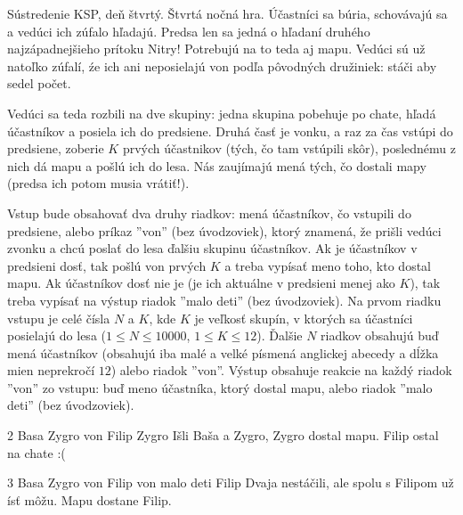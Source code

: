 



Sústredenie KSP, deň štvrtý. Štvrtá nočná hra. Účastníci sa búria, schovávajú 
sa a vedúci ich zúfalo hľadajú. Predsa len sa jedná o hľadaní druhého 
najzápadnejšieho prítoku Nitry! Potrebujú na to teda aj mapu. Vedúci sú už 
natoľko zúfalí, źe ich ani neposielajú von podľa pôvodných družiniek: stáči 
aby sedel počet.

Vedúci sa teda rozbili na dve skupiny: jedna skupina pobehuje po chate, hľadá 
účastníkov a posiela ich do predsiene. Druhá časť je vonku, a raz za čas 
vstúpi do predsiene, zoberie $K$ prvých účastnikov (tých, čo tam vstúpili 
skôr), poslednému z nich dá mapu a pošlú ich do lesa. Nás zaujímajú mená tých, 
čo dostali mapy (predsa ich potom musia vrátiť!).

Vstup bude obsahovať dva druhy riadkov: mená účastníkov, čo vstupili do predsiene, alebo príkaz ''von'' (bez úvodzoviek), ktorý znamená, že prišli vedúci zvonku a chcú poslať do lesa ďalšiu skupinu účastníkov. Ak je účastníkov v predsieni dosť, tak pošlú von prvých $K$ a treba vypísať meno toho, kto dostal mapu. Ak účastníkov dosť nie je (je ich aktuálne v predsieni menej ako $K$), tak treba vypísať na výstup riadok ''malo deti'' (bez úvodzoviek).
Na prvom riadku vstupu je celé čísla $N$ a $K$, kde $K$ je veľkosť skupín, v ktorých sa účastníci posielajú do lesa ($1 \leq N \leq 10000$, $1 \leq K \leq 12$). Ďalšie $N$ riadkov obsahujú buď mená účastníkov (obsahujú iba malé a velké písmená anglickej abecedy a dĺžka mien neprekročí $12$) alebo riadok ''von''.
Výstup obsahuje reakcie na každý riadok ''von'' zo vstupu: buď meno účastníka, ktorý dostal mapu, alebo riadok ''malo deti'' (bez úvodzoviek).

 2
Basa
Zygro
von
Filip
\vystup
Zygro
\komentar
Išli Baša a Zygro, Zygro dostal mapu.
Filip ostal na chate :(
\koniec

 3
Basa
Zygro
von
Filip
von
\vystup
malo deti
Filip
\komentar
Dvaja nestáčili, ale spolu s Filipom už ísť môžu. Mapu dostane Filip.
\koniec


